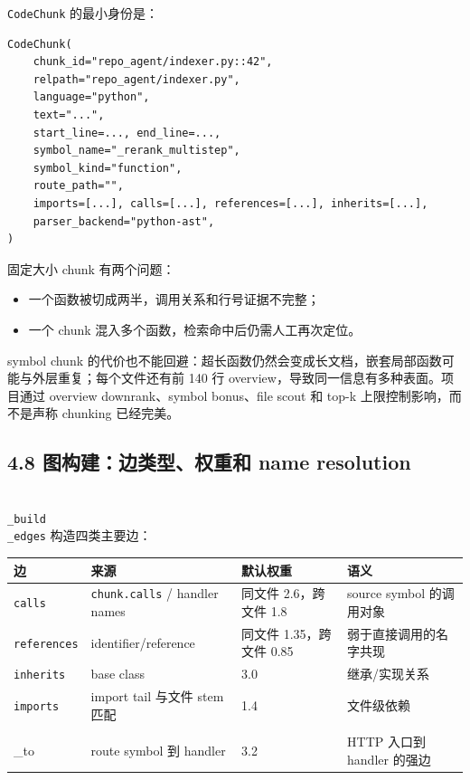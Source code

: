 \documentclass[UTF8,12pt,openany]{ctexbook}
\begin{document}
\texttt{CodeChunk} 的最小身份是：\par

\begin{lstlisting}
CodeChunk(
    chunk_id="repo_agent/indexer.py::42",
    relpath="repo_agent/indexer.py",
    language="python",
    text="...",
    start_line=..., end_line=...,
    symbol_name="_rerank_multistep",
    symbol_kind="function",
    route_path="",
    imports=[...], calls=[...], references=[...], inherits=[...],
    parser_backend="python-ast",
)
\end{lstlisting}

固定大小 chunk 有两个问题：\par

\begin{itemize}
\item 一个函数被切成两半，调用关系和行号证据不完整；
\item 一个 chunk 混入多个函数，检索命中后仍需人工再次定位。
\end{itemize}

symbol chunk 的代价也不能回避：超长函数仍然会变成长文档，嵌套局部函数可能与外层重复；每个文件还有前 140 行 overview，导致同一信息有多种表面。项目通过 overview downrank、symbol bonus、file scout 和 top-k 上限控制影响，而不是声称 chunking 已经完美。\par

\subsection{4.8 图构建：边类型、权重和 name resolution}

\texttt{\\_build\\_edges} 构造四类主要边：\par

\begin{center}
\small
\begin{longtable}{|p{}|p{}|p{}|p{}|}
\toprule
边 & 来源 & 默认权重 & 语义 \\
\midrule
\texttt{calls} & \texttt{chunk.calls} / handler names & 同文件 2.6，跨文件 1.8 & source symbol 的调用对象 \\
\texttt{references} & identifier/reference & 同文件 1.35，跨文件 0.85 & 弱于直接调用的名字共现 \\
\texttt{inherits} & base class & 3.0 & 继承/实现关系 \\
\texttt{imports} & import tail 与文件 stem 匹配 & 1.4 & 文件级依赖 \\
\texttt{routes\\_to} & route symbol 到 handler & 3.2 & HTTP 入口到 handler 的强边 \\
\bottomrule
\end{longtable}
\end{center}
\end{document}

